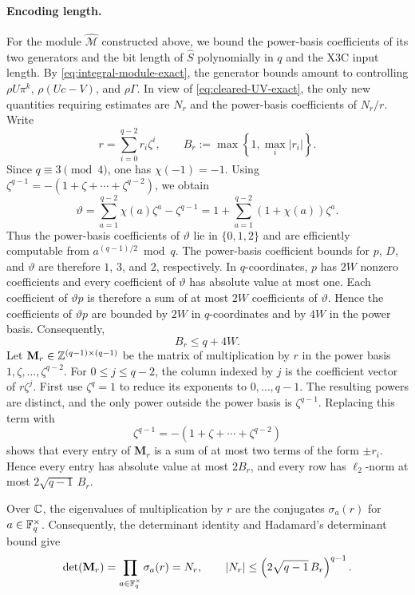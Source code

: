 \paragraph{Encoding length.}
For the module $\widehat{\mathcal M}$ constructed above, we bound
the power-basis coefficients of its two generators and the bit length of
$\widehat S$ polynomially in $q$ and the X3C input length.  By
\cref{eq:integral-module-exact}, the generator bounds amount to controlling
$\rho U\pi^k$, $\rho(Uc-V)$, and $\rho\Gamma$.  In view of
\cref{eq:cleared-UV-exact}, the only new quantities requiring estimates are
$N_r$ and the power-basis coefficients of $N_r/r$.  Write
\[
 r=\sum_{i=0}^{q-2}r_i\zeta^i,
 \qquad
 B_r:=\max\left\{1,\max_i|r_i|\right\}.
\]
Since $q\equiv3\pmod4$, one has $\chi(-1)=-1$.  Using
$\zeta^{q-1}=-(1+\zeta+\cdots+\zeta^{q-2})$, we obtain
\[
 \vartheta
 =\sum_{a=1}^{q-2}\chi(a)\zeta^a-\zeta^{q-1}
 =1+\sum_{a=1}^{q-2}(1+\chi(a))\zeta^a.
\]
Thus the power-basis coefficients of $\vartheta$ lie in $\{0,1,2\}$ and are
efficiently computable from $a^{(q-1)/2}\bmod q$.  The power-basis
coefficient bounds for $p$, $D$, and $\vartheta$ are therefore $1$, $3$, and
$2$, respectively.  In $q$-coordinates, $p$ has $2W$
nonzero coefficients and every coefficient of $\vartheta$ has absolute value
at most one.  Each coefficient of $\vartheta p$ is therefore a sum of at most
$2W$ coefficients of $\vartheta$.  Hence the coefficients of $\vartheta p$
are bounded by $2W$ in $q$-coordinates and by $4W$ in the power basis.
Consequently,
\[
 B_r\le q+4W.
\]
Let $\mathbf M_r\in\mathbb Z^{(q-1)\times(q-1)}$ be the matrix of multiplication
by $r$ in the power basis $1,\zeta,\ldots,\zeta^{q-2}$.  For
$0\le j\le q-2$, the column indexed by $j$ is the coefficient vector of
$r\zeta^j$.  First use $\zeta^q=1$ to reduce its exponents to
$0,\ldots,q-1$.  The resulting powers are distinct, and the only power
outside the power basis is $\zeta^{q-1}$.  Replacing this term with
\[
 \zeta^{q-1}=-(1+\zeta+\cdots+\zeta^{q-2})
\]
shows that every entry of $\mathbf M_r$ is a sum of at most two terms of the
form $\pm r_i$.  Hence every entry has absolute value at most $2B_r$, and
every row has $\ell_2$-norm at most $2\sqrt{q-1}\,B_r$.

Over $\mathbb C$, the eigenvalues of multiplication by $r$ are the conjugates
$\sigma_a(r)$ for $a\in\mathbb F_q^\times$.
Consequently, the determinant identity and Hadamard's determinant
bound give
\begin{equation}
\label{eq:hadamard-norm-r}
 \det(\mathbf M_r)=\prod_{a\in\mathbb F_q^\times}\sigma_a(r)=N_r,
 \qquad
 |N_r|\le\left(2\sqrt{q-1}\,B_r\right)^{q-1}.
\end{equation}

